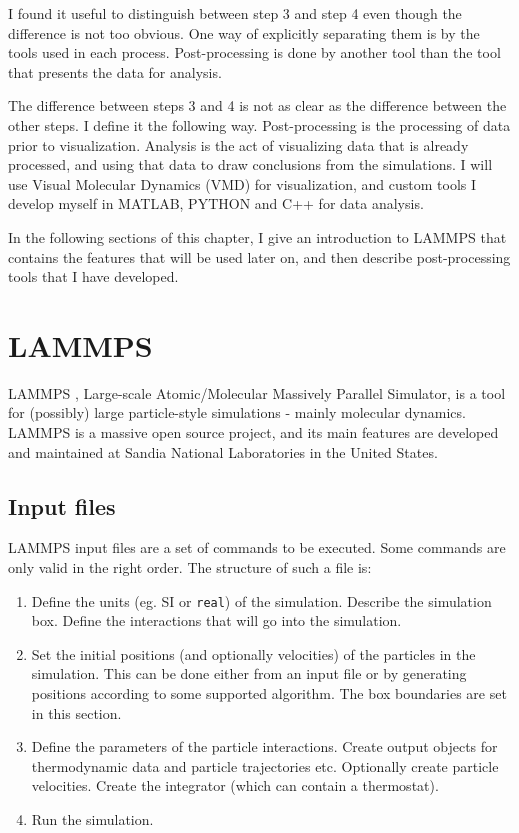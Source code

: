 I found it useful to distinguish between step 3 and step 4 even though the difference is not too obvious. One way of explicitly separating them is by the tools used in each process. Post-processing is done by another tool than the tool that presents the data for analysis. 

The difference between steps 3 and 4 is not as clear as the difference between the other steps. I define it the following way. Post-processing is the processing of data prior to visualization. Analysis is the act of visualizing data that is already processed, and using that data to draw conclusions from the simulations. I will use Visual Molecular Dynamics (VMD) \cite{HUMP96} for visualization, and custom tools I develop myself in MATLAB, PYTHON and C++ for data analysis.

In the following sections of this chapter, I give an introduction to LAMMPS that contains the features that will be used later on, and then describe post-processing tools that I have developed. 

\section{LAMMPS}
LAMMPS \cite{Plimpton1995}, Large-scale Atomic/Molecular Massively Parallel Simulator, is a tool for (possibly) large particle-style simulations - mainly molecular dynamics. LAMMPS is a massive open source project, and its main features are developed and maintained at Sandia National Laboratories in the United States. 

\subsection{Input files}
LAMMPS input files are a set of commands to be executed. Some commands are only valid in the right order. The structure of such a file is:

\begin{enumerate}
\item {} Define the units (eg. SI or {\tt real}) of the simulation. Describe the simulation box. Define the interactions that will go into the simulation. 
\item {} Set the initial positions (and optionally velocities) of the particles in the simulation. This can be done either from an input file or by generating positions according to some supported algorithm. The box boundaries are set in this section.
\item {} Define the parameters of the particle interactions. Create output objects for thermodynamic data and particle trajectories etc. Optionally create particle velocities. Create the integrator (which can contain a thermostat).
\item {} Run the simulation.
\end{enumerate}

